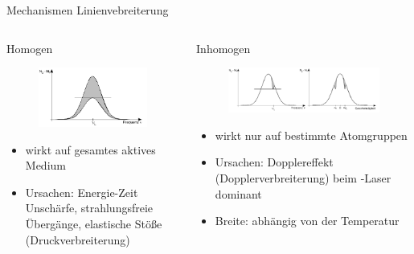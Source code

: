 \documentclass[10pt, aspectratio=169]{beamer}
\newcommand{\hne}{\ce{HeNe}}
\begin{document}
\begin{frame}[t]{Mechanismen Linienvebreiterung}
  \begin{columns}
    \begin{block}{Homogen}
      \begin{figure}
        \includegraphics[width=.4\columnwidth]{homogen.png}
      \end{figure}
      \begin{itemize}
      \item<1-> wirkt auf gesamtes aktives Medium
      \item<2-> Ursachen: Energie-Zeit Unsch\"arfe, strahlungsfreie
        \"Uberg\"ange, elastische St\"o\ss{}e
        (Druckverbreiterung)
      \end{itemize}
    \end{block}
    \begin{block}{Inhomogen}
      \begin{figure}
        \includegraphics[width=.7\columnwidth]{inhomogen.png}
      \end{figure}
      \begin{itemize}
      \item<1-> wirkt nur auf bestimmte Atomgruppen
      \item<2-> Ursachen: Dopplereffekt (Dopplerverbreiterung) beim \hne{}-Laser
        dominant
      \item<3-> Breite: abh\"angig von der Temperatur

      \end{itemize}
    \end{block}
  \end{columns}
\end{frame}
\end{document}

